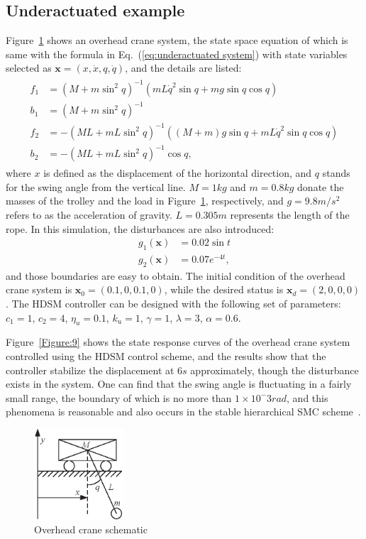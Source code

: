 \documentclass[3p]{elsarticle}
\theoremstyle{plain}
\theoremstyle{remark}
\begin{document}
\subsection{Underactuated example}
Figure~\ref{Figure:8} shows an overhead crane system, the state space equation of which is same with the formula in Eq.~(\ref{eq:underactuated system}) with state variables selected as $\bm x=(x,\dot x,q,\dot q)$, and the details are listed:
\begin{align}
\begin{split}
f_1&=(M+m\sin^2q)^{-1}(mL\dot q^2\sin q+mg\sin q\cos q)\\
b_1&=(M+m\sin^2q)^{-1}\\
f_2&=-(ML+mL\sin^2q)^{-1}((M+m)g\sin q+mL\dot q^2\sin q\cos q)\\
b_2&=-(ML+mL\sin^2q)^{-1}\cos q,
\end{split}
\end{align}
where $x$ is defined as the displacement of the horizontal direction, and $q$ stands for the swing angle from the vertical line. $M=1kg$ and $m=0.8kg$ donate the masses of the trolley and the load in Figure~\ref{Figure:8}, respectively, and $g=9.8m/s^2$ refers to as the acceleration of gravity. $L=0.305m$ represents the length of the rope. In this simulation, the disturbances are also introduced:
\begin{align}
g_1(\bm x)&= 0.02\sin t\\
g_2(\bm x)&=0.07e^{-4t},
\end{align}
and those boundaries are easy to obtain. The initial condition of the overhead crane system is $\bm x_0 = (0.1,0,0.1,0)$, while the desired status is $\bm x_d = (2,0,0,0)$. The HDSM controller can be designed with the following set of parameters:
$c_1=1$, $c_2=4$, $\eta_u = 0.1$, $k_u=1$, $\gamma = 1$, $\lambda = 3$, $\alpha = 0.6$.\par
Figure~\ref{Figure:9} shows the state response curves of the overhead crane system controlled using the HDSM control scheme, and the results show that the controller stabilize the displacement at $6s$ approximately, though the disturbance exists in the system. One can find that the swing angle is fluctuating in a fairly small range, the boundary of which is no more than $1\times 10^-3rad$, and this phenomena is reasonable and also occurs in the stable hierarchical SMC scheme~\cite{wang2004design}.
\begin{figure}
\centering
\includegraphics[width=0.3\textwidth]{paper3_fig8.eps}
\caption{Overhead crane schematic}
\label{Figure:8}
\end{figure}
\end{document}
